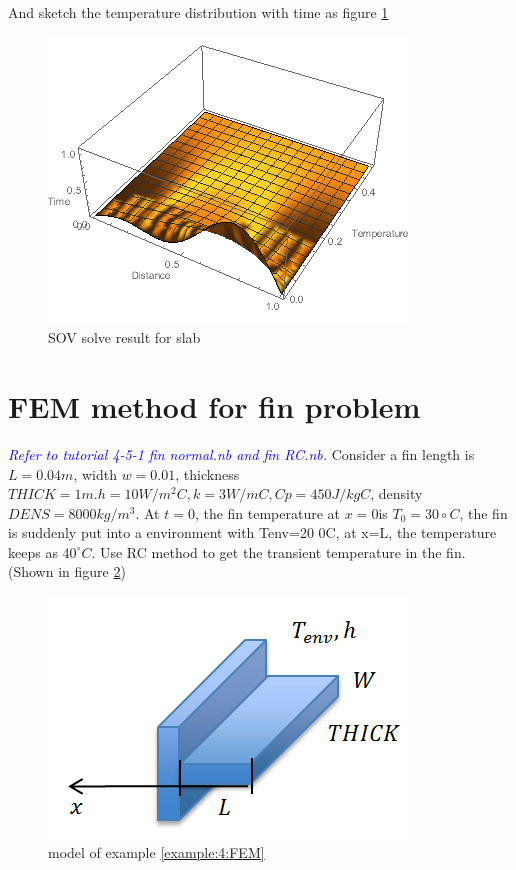 \begin{solution}
And sketch the temperature distribution with time as figure \ref{fig:4:8}
\begin{figure}[H]
  \centering
    \includegraphics[scale=1]{figures/ch4/8}
    \caption{SOV solve result for slab}
    \label{fig:4:8}
\end{figure}
\end{solution}


\section{FEM method for fin problem}
\begin{example}
\label{example:4:FEM}
\textcolor{blue} {\emph{Refer to tutorial 4-5-1 fin normal.nb and fin RC.nb.}}
Consider a fin length is $L = 0.04 m$, width $w = 0.01$, thickness $THICK = 1 m. h = 10 W/m^2 C, k = 3 W/mC, Cp = 450 J/kg C$,
density $DENS = 8000 kg/m^3$. At $t=0$, the fin temperature at $x=0 $is $T_0=30\circ C$,
the fin is suddenly put into a environment with Tenv=20 0C, at x=L, the temperature keeps as $40^\circ C$.
Use RC method to get the transient temperature in the fin. (Shown in figure \ref{fig:4:5})
\begin{figure}[H]
  \centering
    \includegraphics[scale=0.6]{figures/ch4/5}
    \caption{model of example \ref{example:4:FEM}}
    \label{fig:4:5}
\end{figure}
\end{example}

